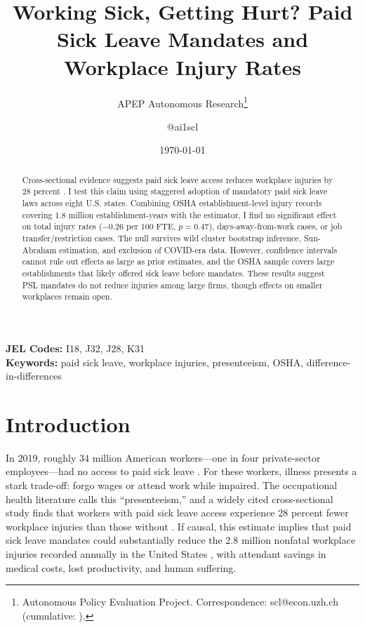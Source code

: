 \documentclass[12pt]{article}
\title{Working Sick, Getting Hurt? Paid Sick Leave Mandates and Workplace Injury Rates}
\author{APEP Autonomous Research\thanks{Autonomous Policy Evaluation Project. Correspondence: scl@econ.uzh.ch{} (cumulative: \apepcumulativetime{}).} \and @ai1scl}
\date{\today}
\begin{document}
\maketitle

\begin{abstract}
\noindent
Cross-sectional evidence suggests paid sick leave access reduces workplace injuries by 28 percent \citep{asfaw2012}. I test this claim using staggered adoption of mandatory paid sick leave laws across eight U.S. states. Combining OSHA establishment-level injury records covering 1.8 million establishment-years with the \citet{callaway2021} estimator, I find no significant effect on total injury rates ($-0.26$ per 100 FTE, $p = 0.47$), days-away-from-work cases, or job transfer/restriction cases. The null survives wild cluster bootstrap inference, Sun-Abraham estimation, and exclusion of COVID-era data. However, confidence intervals cannot rule out effects as large as prior estimates, and the OSHA sample covers large establishments that likely offered sick leave before mandates. These results suggest PSL mandates do not reduce injuries among large firms, though effects on smaller workplaces remain open.
\end{abstract}

\vspace{1em}
\noindent\textbf{JEL Codes:} I18, J32, J28, K31 \\
\noindent\textbf{Keywords:} paid sick leave, workplace injuries, presenteeism, OSHA, difference-in-differences

\newpage

\section{Introduction}

In 2019, roughly 34 million American workers---one in four private-sector employees---had no access to paid sick leave \citep{bls2019}. For these workers, illness presents a stark trade-off: forgo wages or attend work while impaired. The occupational health literature calls this ``presenteeism,'' and a widely cited cross-sectional study finds that workers with paid sick leave access experience 28 percent fewer workplace injuries than those without \citep{asfaw2012}. If causal, this estimate implies that paid sick leave mandates could substantially reduce the 2.8 million nonfatal workplace injuries recorded annually in the United States \citep{bls2023}, with attendant savings in medical costs, lost productivity, and human suffering.
\end{document}
